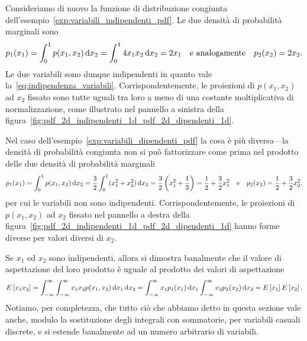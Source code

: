 \begin{examplebox}
  \begin{example}\label{exp:variabili_indipendenti_marg}
    Consideriamo di nuovo la funzione di distribuzione congiunta
    dell'esempio~\ref{exp:variabili_indipendenti_pdf}. Le due densità di
    probabilità marginali sono
    \begin{align*}
      p_1(x_1) = \int_0^1 p(x_1, x_2)\diff[x_2] =
      \int_0^1 4x_1x_2\diff[x_2] = 2 x_1 \quad \text{e analogamente} \quad
      p_2(x_2) = 2 x_2.
    \end{align*}
    Le due variabili sono dunque indipendenti in quanto vale
    la~\eqref{eq:indipendenza_variabili}. Corrispondentemente, le proiezioni di
    $p(x_1, x_2)$ ad $x_2$ fissato sono tutte uguali tra loro a meno di una
    costante moltiplicativa di normalizzazione, come illustrato nel pannello a
    sinistra della figura~\ref{fig:pdf_2d_indipendenti_1d_pdf_2d_dipendenti_1d}.
  \end{example}

  \begin{example}
    Nel caso dell'esempio~\ref{exp:variabili_dipendenti_pdf} la cosa è più
    diversa---la densità di probabilità congiunta non si può fattorizzare
    come prima nel prodotto delle due densità di probabilità marginali
    \begin{align*}
      p_1(x_1) = \int_0^1 p(x_1, x_2)\diff[x_2] =
      \frac{3}{2}\int_0^1 (x_1^2 + x_2^2)\diff[x_2] =
      \frac{3}{2}\left( x_1^2 + \frac{1}{3} \right) =
      \frac{1}{2} + \frac{3}{2}x_1^2
      \quad \text{e} \quad
      p_2(x_2) = \frac{1}{2} + \frac{3}{2}x_2^2,
    \end{align*}
    per cui le variabili non sono indipendenti. Corrispondentemente, le proiezioni di
    $p(x_1, x_2)$ ad $x_2$ fissato nel pannello a destra della
    figura~\ref{fig:pdf_2d_indipendenti_1d_pdf_2d_dipendenti_1d} hanno forme
    diverse per valori diversi di $x_2$.
  \end{example}
\end{examplebox}

Se $x_1$ ed $x_2$ sono indipendenti, allora si dimostra banalmente che il valore
di aspettazione del loro prodotto è uguale al prodotto dei valori di
aspettazione
\begin{align}\label{eq:aspettazione_indipendenza}
  \expect{x_1x_2} =
  \int_{-\infty}^{\infty}\int_{-\infty}^{\infty} x_1x_2p(x_1, x_2)\diff[x_1]\diff[x_2] =
  \int_{-\infty}^{\infty} x_1 p_1(x_1)\diff[x_1]
  \int_{-\infty}^{\infty} x_2 p_2(x_2)\diff[x_2] =
  \expect{x_1}\expect{x_2}.
\end{align}
Notiamo, per completezza, che tutto ciò che abbiamo detto in questa
sezione vale anche, modulo la sostituzione degli integrali con sommatorie,
per variabili casuali discrete, e si estende banalmente ad un numero arbitrario
di variabili.


